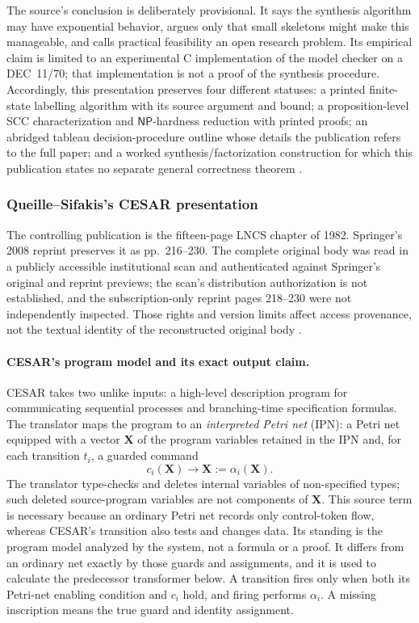 The source's conclusion is deliberately provisional.  It says the synthesis
algorithm may have exponential behavior, argues only that small skeletons
might make this manageable, and calls practical feasibility an open research
problem.  Its empirical claim is limited to an experimental C implementation
of the model checker on a DEC~11/70; that implementation is not a proof of
the synthesis procedure.  Accordingly, this presentation preserves four
different statuses: a printed finite-state labelling algorithm with its source
argument and bound; a proposition-level SCC characterization and
\(\mathsf{NP}\)-hardness reduction with printed proofs; an abridged tableau
decision-procedure outline whose details the publication refers to the full
paper; and a worked synthesis/factorization construction for which this
publication states no separate general correctness theorem
\cite[pp.~59--63, 69--70]{ClarkeEmerson1981}.

\subsubsection{Queille--Sifakis's CESAR presentation}
\label{sec:p09-presentation-n-c-016-queille-sifakis}

The controlling publication is the fifteen-page LNCS chapter of 1982.
Springer's 2008 reprint preserves it as pp.~216--230.  The complete original
body was read in a publicly accessible institutional scan and authenticated
against Springer's original and reprint previews; the scan's distribution
authorization is not established, and the subscription-only reprint pages
218--230 were not independently inspected.  Those rights and version limits
affect access provenance, not the textual identity of the reconstructed
original body \cite{QueilleSifakis1982}.

\paragraph{CESAR's program model and its exact output claim.}
CESAR takes two unlike inputs: a high-level description program for
communicating sequential processes and branching-time specification formulas.
The translator maps the program to an \emph{interpreted Petri net} (IPN):
a Petri net equipped with a vector \(\mathbf X\) of the program variables
retained in the IPN and, for each transition \(t_i\), a guarded command
\[
 c_i(\mathbf X)\longrightarrow \mathbf X:=\alpha_i(\mathbf X).
\]
The translator type-checks and deletes internal variables of non-specified
types; such deleted source-program variables are not components of
\(\mathbf X\).
This source term is necessary because an ordinary Petri net records only
control-token flow, whereas CESAR's transition also tests and changes data.
Its standing is the program model analyzed by the system, not a
formula or a proof.  It differs from an ordinary net exactly by those guards
and assignments, and it is used to calculate the predecessor transformer
below.  A transition fires only when both its Petri-net enabling condition and
\(c_i\) hold, and firing performs \(\alpha_i\).  A missing inscription means
the true guard and identity assignment.

